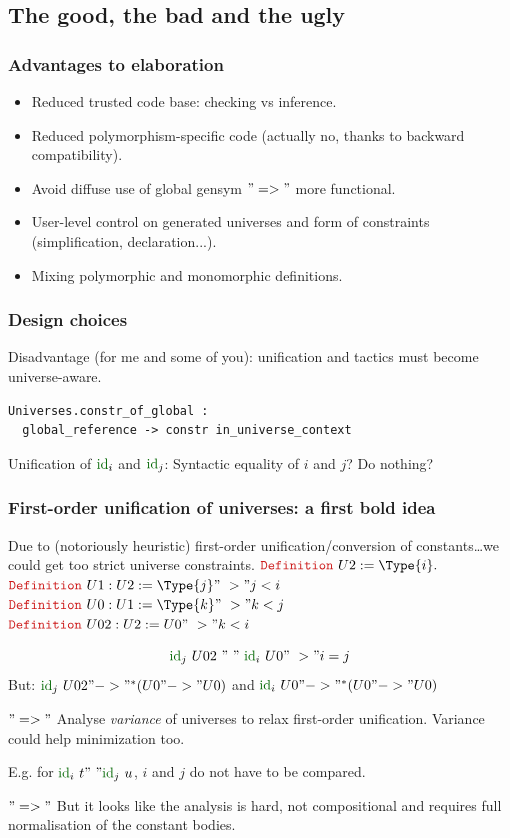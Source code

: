 \subsection{The good, the bad and the ugly}
\begin{frame}
  \frametitle{Advantages to elaboration}

  \begin{itemize}
  \item Reduced trusted code base: checking vs inference.
  \item Reduced polymorphism-specific code (actually
    no, thanks to backward compatibility).
  \item Avoid diffuse use of global gensym $"=>"$ more functional.
  \item User-level control on generated universes and form of
    constraints (simplification, declaration...).
  \item Mixing polymorphic and monomorphic definitions.
  \end{itemize}
\end{frame}
 
\begin{frame}[fragile]
  \frametitle{Design choices}

  Disadvantage (for me and some of you): unification and tactics must become universe-aware.

\begin{verbatim}
Universes.constr_of_global : 
  global_reference -> constr in_universe_context
\end{verbatim}
   
  Unification of $\cst{id}_i$ and $\cst{id}_j$:
  Syntactic equality of $i$ and $j$? Do nothing?

\end{frame}


\begin{frame}
  \frametitle{First-order unification of universes: a first bold idea}

  Due to (notoriously heuristic) first-order unification/conversion of
  constants\ldots we could get too strict universe constraints.
  $\kw{Definition}~U2 := \Type{i}.$
  $\kw{Definition}~U1 : U2 := \Type{j} "~>" j < i$
  $\kw{Definition}~U0 : U1 := \Type{k} "~>" k < j$
  $\kw{Definition}~U02 : U2 := U0 "~>" k < i$

  \[\cst{id}_j~U02~"~"~\cst{id}_i~U0 "~>" i = j\]
  But:
  $\cst{id}_j~U02 "->"^* (U0 "->" U0)$ and
  $\cst{id}_i~U0 "->"^* (U0 "->" U0)$

  \begin{center}
    $"=>"$ Analyse \emph{variance} of universes to relax first-order
    unification. Variance could help minimization too.
  \end{center}

  E.g. for $\cst{id}_i~t "~" \cst{id}_j~u$, $i$ and $j$ do not have to be
  compared.
  \vfill

  \alert{$"=>"$} But it looks like the analysis is hard, not
  compositional and requires full normalisation of the constant bodies.
\end{frame}

